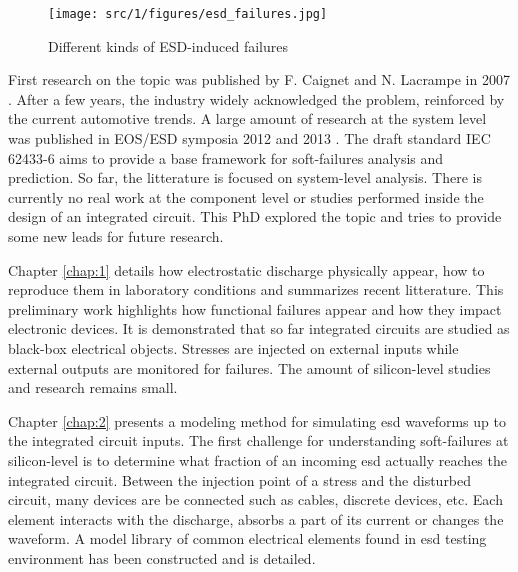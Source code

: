 \begin{figure}[!h]
  \centering
  \texttt{[image: src/1/figures/esd\_failures.jpg]}
  \caption{Different kinds of ESD-induced failures}
  \label{fig:esd-failures}
\end{figure}

First research on the topic was published by F. Caignet and N. Lacrampe in 2007 \cite{}.
After a few years, the industry widely acknowledged the problem, reinforced by the current automotive trends.
A large amount of research at the system level was published in EOS/ESD symposia 2012 \cite{} and 2013 \cite{}.
The draft standard IEC 62433-6 aims to provide a base framework for soft-failures analysis and prediction.
So far, the litterature is focused on system-level analysis.
There is currently no real work at the component level or studies performed inside the design of an integrated circuit.
This PhD explored the topic and tries to provide some new leads for future research.

%
Chapter \ref{chap:1} details how electrostatic discharge physically appear, how to reproduce them in laboratory conditions and summarizes recent litterature.
This preliminary work highlights how functional failures appear and how they impact electronic devices.
It is demonstrated that so far integrated circuits are studied as black-box electrical objects.
Stresses are injected on external inputs while external outputs are monitored for failures.
The amount of silicon-level studies and research remains small.

%
Chapter \ref{chap:2} presents a modeling method for simulating \gls{esd} waveforms up to the integrated circuit inputs.
The first challenge for understanding soft-failures at silicon-level is to determine what fraction of an incoming \gls{esd} actually reaches the integrated circuit.
Between the injection point of a stress and the disturbed circuit, many devices are be connected such as cables, discrete devices, etc.
Each element interacts with the discharge, absorbs a part of its current or changes the waveform.
A model library of common electrical elements found in \gls{esd} testing environment has been constructed and is detailed.

